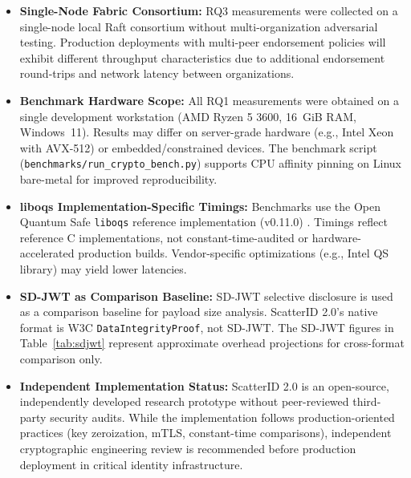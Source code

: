 \documentclass[5p,times,authoryear]{elsarticle}
\begin{document}
\begin{itemize}[leftmargin=*]
\item \textbf{Single-Node Fabric Consortium:} RQ3 measurements were collected on a single-node local Raft consortium without multi-organization adversarial testing. Production deployments with multi-peer endorsement policies will exhibit different throughput characteristics due to additional endorsement round-trips and network latency between organizations.
\item \textbf{Benchmark Hardware Scope:} All RQ1 measurements were obtained on a single development workstation (AMD Ryzen 5 3600, 16~GiB RAM, Windows~11). Results may differ on server-grade hardware (e.g., Intel Xeon with AVX-512) or embedded/constrained devices. The benchmark script (\texttt{benchmarks/run\_crypto\_bench.py}) supports CPU affinity pinning on Linux bare-metal for improved reproducibility.
\item \textbf{liboqs Implementation-Specific Timings:} Benchmarks use the Open Quantum Safe \texttt{liboqs} reference implementation (v0.11.0) \cite{liboqs2024}. Timings reflect reference C implementations, not constant-time-audited or hardware-accelerated production builds. Vendor-specific optimizations (e.g., Intel QS library) may yield lower latencies.
\item \textbf{SD-JWT as Comparison Baseline:} SD-JWT selective disclosure is used as a comparison baseline for payload size analysis. ScatterID 2.0's native format is W3C \texttt{DataIntegrityProof}, not SD-JWT. The SD-JWT figures in Table~\ref{tab:sdjwt} represent approximate overhead projections for cross-format comparison only.
\item \textbf{Independent Implementation Status:} ScatterID 2.0 is an open-source, independently developed research prototype without peer-reviewed third-party security audits. While the implementation follows production-oriented practices (key zeroization, mTLS, constant-time comparisons), independent cryptographic engineering review is recommended before production deployment in critical identity infrastructure.
\end{itemize}
\end{document}
